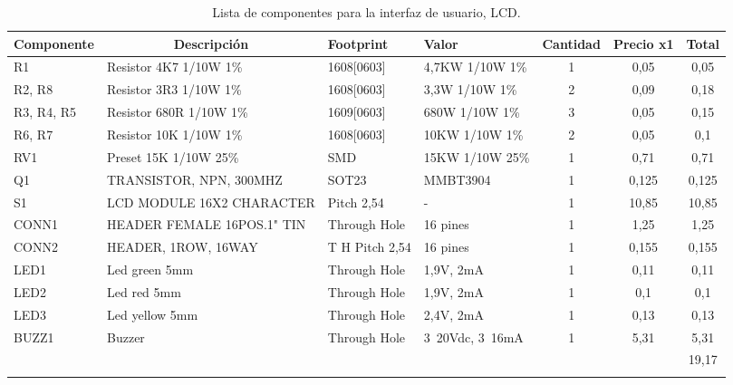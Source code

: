 \begin{longtable}{|l|p{3cm}|p{2cm}|p{2cm}|c|c|c|}
\hline
\multicolumn{1}{|c|}{\textbf{Componente}} & \multicolumn{1}{c|}{\textbf{Descripción}} & \textbf{ Footprint} & \textbf{Valor} & \textbf{Cantidad} & \textbf{Precio x1} & \textbf{Total} \\ \hline
R1 & Resistor 4K7    1/10W     1\% & 1608[0603] & 4,7KW  1/10W   1\% & 1 & 0,05 & 0,05 \\ \hline
R2, R8 & Resistor 3R3    1/10W     1\% & 1608[0603] & 3,3W    1/10W   1\% & 2 & 0,09 & 0,18 \\ \hline
R3, R4, R5 & Resistor 680R  1/10W     1\% & 1609[0603] & 680W   1/10W   1\% & 3 & 0,05 & 0,15 \\ \hline
R6, R7 & Resistor 10K    1/10W     1\% & 1608[0603] & 10KW  1/10W   1\% & 2 & 0,05 & 0,1 \\ \hline
RV1 & Preset 15K        1/10W  25\% & SMD & 15KW   1/10W  25\% & 1 & 0,71 & 0,71 \\ \hline
Q1 & TRANSISTOR, NPN, 300MHZ & SOT23 & MMBT3904 & 1 & 0,125 & 0,125 \\ \hline
S1 & LCD MODULE 16X2 CHARACTER & Pitch 2,54 & - & 1 & 10,85 & 10,85 \\ \hline
CONN1 & HEADER FEMALE 16POS.1" TIN & Through Hole & 16 pines & 1 & 1,25 & 1,25 \\ \hline
CONN2 & HEADER, 1ROW, 16WAY & T H Pitch 2,54 & 16 pines & 1 & 0,155 & 0,155 \\ \hline
LED1 & Led green 5mm & Through Hole & 1,9V,  2mA & 1 & 0,11 & 0,11 \\ \hline
LED2 & Led red 5mm & Through Hole & 1,9V,  2mA & 1 & 0,1 & 0,1 \\ \hline
LED3 & Led yellow 5mm & Through Hole & 2,4V,  2mA & 1 & 0,13 & 0,13 \\ \hline
BUZZ1 & Buzzer & Through Hole & 3~20Vdc, 3~16mA & 1 & 5,31 & 5,31 \\ \hline
 &  & \multicolumn{1}{l|}{} & \multicolumn{1}{l|}{} & \multicolumn{1}{l|}{} & \multicolumn{1}{l|}{} & 19,17 \\ \hline
\caption{Lista de componentes para la interfaz de usuario, LCD.}
\label{}
\end{longtable}



